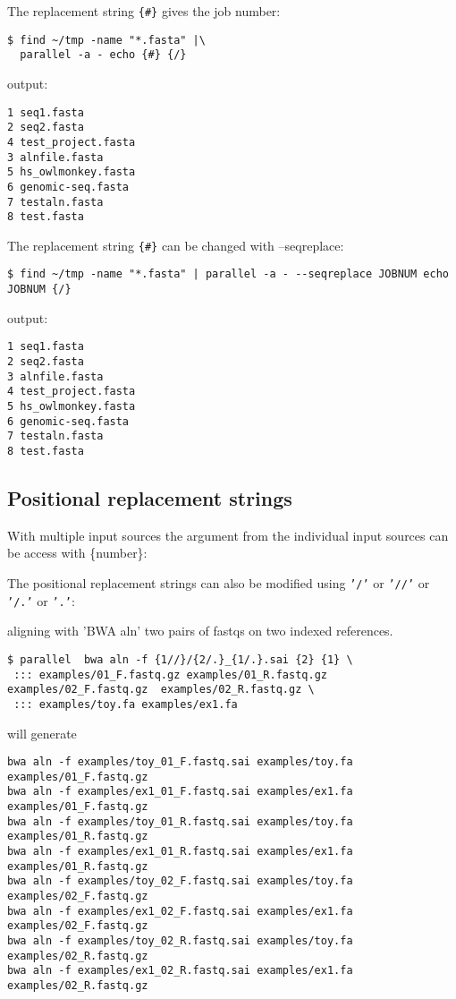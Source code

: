 \documentclass{article}
\begin{document}
The replacement string \texttt{\{\#\}} gives the job number:
\begin{lstlisting}
$ find ~/tmp -name "*.fasta" |\
  parallel -a - echo {#} {/}
\end{lstlisting}
output:
\begin{lstlisting}
1 seq1.fasta
2 seq2.fasta
4 test_project.fasta
3 alnfile.fasta
5 hs_owlmonkey.fasta
6 genomic-seq.fasta
7 testaln.fasta
8 test.fasta
\end{lstlisting}

The replacement string \texttt{\{\#\}} can be changed with --seqreplace:
\begin{lstlisting}
$ find ~/tmp -name "*.fasta" | parallel -a - --seqreplace JOBNUM echo JOBNUM {/}
\end{lstlisting}
output:
\begin{lstlisting}
1 seq1.fasta
2 seq2.fasta
3 alnfile.fasta
4 test_project.fasta
5 hs_owlmonkey.fasta
6 genomic-seq.fasta
7 testaln.fasta
8 test.fasta
\end{lstlisting}


\subsection{Positional replacement strings}
With multiple input sources the argument from the individual input sources can be access with \{number\}:


The positional replacement strings can also be modified using  \texttt{'/'}  or \texttt{'//'} or \texttt{'/.'} or  \texttt{'.'}:

aligning with 'BWA aln' two pairs of fastqs on two indexed references.
\begin{lstlisting}
$ parallel  bwa aln -f {1//}/{2/.}_{1/.}.sai {2} {1} \
 ::: examples/01_F.fastq.gz examples/01_R.fastq.gz examples/02_F.fastq.gz  examples/02_R.fastq.gz \
 ::: examples/toy.fa examples/ex1.fa
\end{lstlisting}
will generate
\begin{lstlisting}
bwa aln -f examples/toy_01_F.fastq.sai examples/toy.fa examples/01_F.fastq.gz
bwa aln -f examples/ex1_01_F.fastq.sai examples/ex1.fa examples/01_F.fastq.gz
bwa aln -f examples/toy_01_R.fastq.sai examples/toy.fa examples/01_R.fastq.gz
bwa aln -f examples/ex1_01_R.fastq.sai examples/ex1.fa examples/01_R.fastq.gz
bwa aln -f examples/toy_02_F.fastq.sai examples/toy.fa examples/02_F.fastq.gz
bwa aln -f examples/ex1_02_F.fastq.sai examples/ex1.fa examples/02_F.fastq.gz
bwa aln -f examples/toy_02_R.fastq.sai examples/toy.fa examples/02_R.fastq.gz
bwa aln -f examples/ex1_02_R.fastq.sai examples/ex1.fa examples/02_R.fastq.gz
\end{lstlisting}
\end{document}
